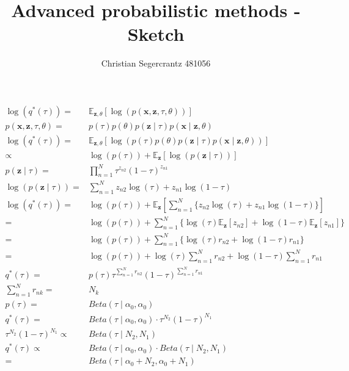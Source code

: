 \documentclass{article}
\title{Advanced probabilistic methods - Sketch}
\author{Christian Segercrantz 481056}
\begin{document}
	\maketitle
	\pagebreak
\begin{align}
	\log(q^*(\tau)) =& \mathbb{E}_{\mathbf{z}, \theta}\left[ \log(p(\mathbf{x},\mathbf{z},\tau, \theta))\right] \\
	p(\mathbf{x},\mathbf{z},\tau, \theta) =& p(\tau)p(\theta)p(\mathbf{z} \mid \tau)p(\mathbf{x}\mid \mathbf{z}, \theta)\\
	\log(q^*(\tau)) =& \mathbb{E}_{\mathbf{z}, \theta}\left[ \log(p(\tau)p(\theta)p(\mathbf{z} \mid \tau)p(\mathbf{x}\mid \mathbf{z}, \theta)	)\right] \\
	\propto & \log(p(\tau)) + \mathbb{E}_{\mathbf{z}}\left[\log(p(\mathbf{z} \mid \tau))\right]\\
	p(\mathbf{z} \mid \tau) =&  \prod_{n=1}^{N}\tau^{z_{n2}}(1-\tau)^{z_{n1}}\\
	\log(p(\mathbf{z} \mid \tau)) =& \sum_{n=1}^{N}z_{n2}\log(\tau) + z_{n1}\log(1-\tau)\\
	\log(q^*(\tau)) =& \log(p(\tau)) + \mathbb{E}_{\mathbf{z}}\left[\sum_{n=1}^{N}\lbrace z_{n2}\log(\tau) + z_{n1}\log(1-\tau)\rbrace\right]\\
	=& \log(p(\tau)) + \sum_{n=1}^{N}\lbrace \log(\tau)\mathbb{E}_{\mathbf{z}}\left[z_{n2}\right] + \log(1-\tau)\mathbb{E}_{\mathbf{z}}\left[z_{n1}\right] \rbrace\\
	=& \log(p(\tau)) + \sum_{n=1}^{N}\lbrace \log(\tau)r_{n2} + \log(1-\tau)r_{n1} \rbrace\\
	=& \log(p(\tau)) + \log(\tau)\sum_{n=1}^{N} r_{n2} + \log(1-\tau)\sum_{n=1}^{N} r_{n1} \\
	q^*(\tau) =& p(\tau)  \tau ^{ \sum_{n=1}^{N} r_{n2}} (1-\tau)^{\sum_{n=1}^{N} r_{n1}}\\
	\sum_{n=1}^{N} r_{nk} =& N_k\\
	p(\tau) =& Beta(\tau \mid \alpha_0, \alpha_0) \\
	q^*(\tau) =& Beta(\tau \mid \alpha_0, \alpha_0) \cdot \tau ^{ N_2} (1-\tau)^{N_1} \\
	\tau ^{ N_2} (1-\tau)^{N_1} \propto& Beta(\tau \mid N_2, N_1) \\
	q^*(\tau) \propto& Beta(\tau \mid \alpha_0, \alpha_0) \cdot Beta(\tau \mid N_2, N_1)\\
	=& Beta(\tau \mid \alpha_0 + N_2, \alpha_0 + N_1)
\end{align}
\end{document}
